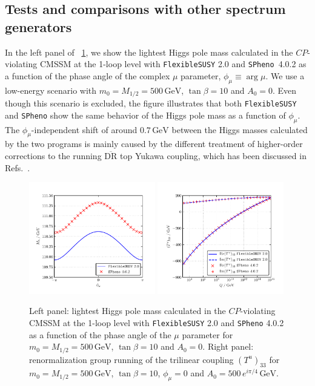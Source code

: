 \documentclass[final,3p,11pt,pdflatex]{elsarticle}
\makeatletter
\newcommand{\spheno}{\texttt{SPheno}\@\xspace}
\newcommand{\fs}{\texttt{FlexibleSUSY}\@\xspace}
\newcommand{\fstwo}{\fs 2.0\@\xspace}
\newcommand{\ol}[1]{\overline{#1}}
\newcommand{\DRbar}{\ensuremath{\ol{\text{DR}}}\xspace}
\newcommand{\unit}[1]{\,\text{#1}}      %
\newcommand{\figref}[1]{\figurename~\ref{#1}}
\newcommand{\CP}{\ensuremath{CP}\xspace}
\newcommand{\azero}{\ensuremath{A_0}\xspace}
\newcommand{\mhalf}{\ensuremath{M_{1/2}}\xspace}
\newcommand{\mzero}{\ensuremath{m_0}\xspace}
\makeatother
\begin{document}
\subsection{Tests and comparisons with other spectrum generators}
%
In the left panel of \figref{fig:CMSSMCPV_plots}, we show the lightest
Higgs pole mass calculated in the \CP-violating CMSSM at the 1-loop
level with \fstwo and \spheno~4.0.2 as a function of the phase angle
of the complex $\mu$ parameter, $\phi_\mu \equiv \arg \mu$.
We use a low-energy scenario with $\mzero = \mhalf = 500\unit{GeV}$,
$\tan\beta = 10$ and $\azero = 0$.  Even though this scenario is
excluded, the figure illustrates that both \fs and \spheno show the
same behavior of the Higgs pole mass as a function of $\phi_\mu$.
The $\phi_\mu$-independent shift of around $0.7\unit{GeV}$ between the
Higgs masses calculated by the two programs is mainly caused by the
different treatment of higher-order corrections to
the running \DRbar top Yukawa coupling, which has been discussed in
Refs.~\cite{Staub:2015aea,ThomasKwasnitza:2016yqj}.
%
\begin{figure}[tbh]
  \centering
  \includegraphics[width=0.49\textwidth]{doc/manuals/plots/CMSSMCPV/scan_Mh_PhiMu_m0-500_M12-500_TB-10_A0-0}\hfill
  \includegraphics[width=0.49\textwidth]{doc/manuals/plots/CMSSMCPV/scan_TYu33_Q_m0-500_M12-500_TB-10_A0-500_PhiMu-0_PhiA0-Pi4}
  \caption{Left panel: lightest Higgs pole mass calculated in the
    \CP-violating CMSSM at the 1-loop level with \fstwo and
    \spheno 4.0.2 as a function of the phase angle of the $\mu$
    parameter for $\mzero = \mhalf = 500\unit{GeV}$, $\tan\beta = 10$
    and $\azero = 0$.  Right panel: renormalization group running of the
    trilinear coupling $(T^u)_{33}$ for $\mzero = \mhalf =
    500\unit{GeV}$, $\tan\beta = 10$, $\phi_\mu = 0$ and $\azero = 500\,
    e^{i \pi/4} \unit{GeV}$.}
  \label{fig:CMSSMCPV_plots}
\end{figure}
\end{document}
